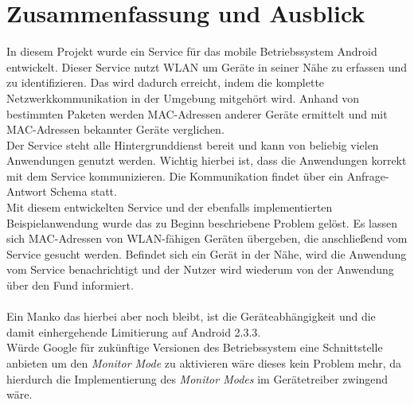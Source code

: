 \documentclass[]{report}
\begin{document}
\chapter{Zusammenfassung und Ausblick}
In diesem Projekt wurde ein Service für das mobile Betriebssystem Android entwickelt. Dieser Service nutzt WLAN um Geräte in seiner Nähe zu erfassen und zu identifizieren. Das wird dadurch erreicht, indem die komplette Netzwerkkommunikation in der Umgebung mitgehört wird. Anhand von bestimmten Paketen werden MAC-Adressen anderer Geräte ermittelt und mit MAC-Adressen bekannter Geräte verglichen. \\ 
Der Service steht alle Hintergrunddienst bereit und kann von beliebig vielen Anwendungen genutzt werden. Wichtig hierbei ist, dass die Anwendungen korrekt mit dem Service kommunizieren. Die Kommunikation findet über ein Anfrage-Antwort Schema statt. \\
Mit diesem entwickelten Service und der ebenfalls implementierten Beispielanwendung wurde das zu Beginn beschriebene Problem gelöst. Es lassen sich MAC-Adressen von WLAN-fähigen Geräten übergeben, die anschließend vom Service gesucht werden. Befindet sich ein Gerät in der Nähe, wird die Anwendung vom Service benachrichtigt und der Nutzer wird wiederum von der Anwendung über den Fund informiert. \\\\
Ein Manko das hierbei aber noch bleibt, ist die Geräteabhängigkeit und die damit einhergehende Limitierung auf Android 2.3.3. \\ Würde Google für zukünftige Versionen des Betriebssystem eine Schnittstelle anbieten um den \textit{Monitor Mode} zu aktivieren wäre dieses kein Problem mehr, da hierdurch die Implementierung des \textit{Monitor Modes} im Gerätetreiber zwingend wäre.
\end{document}
